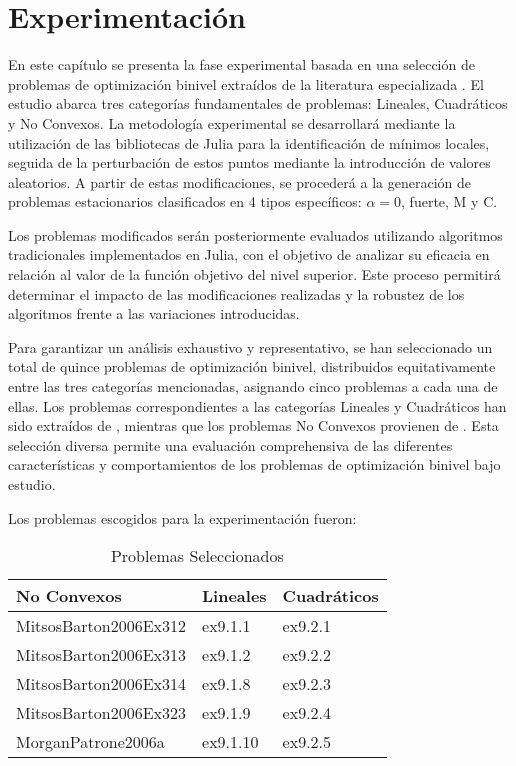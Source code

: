 
\chapter{Experimentación}


En este capítulo se presenta la fase experimental basada en una selección de problemas de optimización binivel extraídos de la literatura especializada \cite{BolibTestProblems}. El estudio abarca tres categorías fundamentales de problemas: Lineales, Cuadráticos y No Convexos. La metodología experimental se desarrollará mediante la utilización de las bibliotecas de Julia para la identificación de mínimos locales, seguida de la perturbación de estos puntos mediante la introducción de valores aleatorios. A partir de estas modificaciones, se procederá a la generación de problemas estacionarios clasificados en 4 tipos específicos: $\alpha = 0$, fuerte, M y C.

Los problemas modificados serán posteriormente evaluados utilizando algoritmos tradicionales implementados en Julia, con el objetivo de analizar su eficacia en relación al valor de la función objetivo del nivel superior. Este proceso permitirá determinar el impacto de las modificaciones realizadas y la robustez de los algoritmos frente a las variaciones introducidas.

Para garantizar un análisis exhaustivo y representativo, se han seleccionado un total de quince problemas de optimización binivel, distribuidos equitativamente entre las tres categorías mencionadas, asignando cinco problemas a cada una de ellas. Los problemas correspondientes a las categorías Lineales y Cuadráticos han sido extraídos de \cite{Floudas1999HandbookOT}, mientras que los problemas No Convexos provienen de \cite{BolibTestProblems}. Esta selección diversa permite una evaluación comprehensiva de las diferentes características y comportamientos de los problemas de optimización binivel bajo estudio.


Los problemas escogidos para la experimentación fueron:

\begin{table}[h!]
\centering
\caption{Problemas Seleccionados}
\begin{tabular}{ | m{5cm} | m{5cm} | m{5cm} | }
  
  \hline
  \textbf{No Convexos} & \textbf{Lineales} & \textbf{Cuadráticos} \\
  \hline
  MitsosBarton2006Ex312 & ex9.1.1 & ex9.2.1 \\
  \hline
  MitsosBarton2006Ex313 & ex9.1.2 & ex9.2.2 \\
  \hline
  MitsosBarton2006Ex314 & ex9.1.8 & ex9.2.3\\
  \hline
  MitsosBarton2006Ex323 & ex9.1.9 & ex9.2.4\\
  \hline
  MorganPatrone2006a & ex9.1.10 & ex9.2.5 \\
  \hline
\end{tabular}
\end{table}




